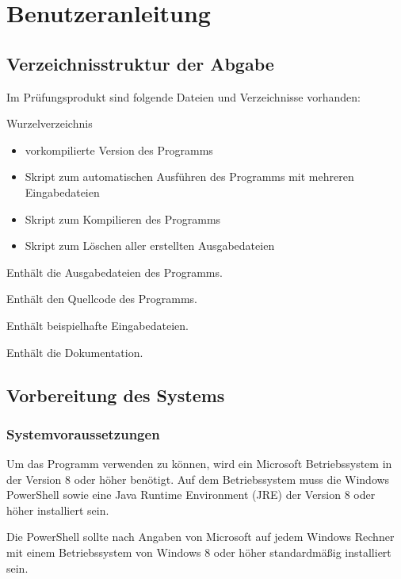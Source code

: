 \chapter{Benutzeranleitung}
\label{Benutzeranleitung}
\vspace{-0.2cm}
\section{Verzeichnisstruktur der Abgabe}
Im Prüfungsprodukt sind folgende Dateien und Verzeichnisse vorhanden:
\begin{description}
	\item [Wurzelverzeichnis]
\end{description}		
	\begin{itemize}
		\item vorkompilierte Version des Programms
		\item Skript zum automatischen Ausführen des Programms mit mehreren Eingabedateien
		\item Skript zum Kompilieren des Programms
		\item Skript zum Löschen aller erstellten Ausgabedateien
	\end{itemize}
\begin{description}
	\item [Output] Enthält die Ausgabedateien des Programms.
	\item [src] Enthält den Quellcode des Programms.
	\item [Tests] Enthält beispielhafte Eingabedateien.
	\item [Doku] Enthält die Dokumentation.
\end{description}
\vspace{-0.2cm}
\section{Vorbereitung des Systems}
\subsection{Systemvoraussetzungen}
Um das Programm verwenden zu können, wird ein Microsoft Betriebssystem in der Version 8 oder höher benötigt. Auf dem Betriebssystem muss die Windows PowerShell sowie eine Java Runtime Environment (JRE) der Version 8 oder höher installiert sein.

Die PowerShell sollte nach Angaben von Microsoft auf jedem Windows Rechner mit einem Betriebssystem von Windows 8 oder höher standardmäßig installiert sein.

